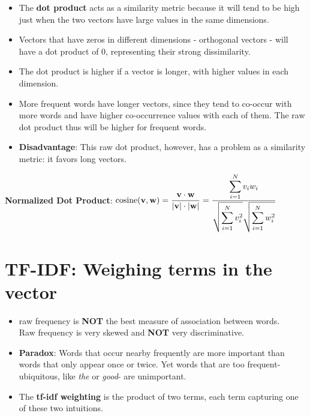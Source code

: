 \begin{itemize}
    \item The \textbf{dot product} acts as a similarity metric because it will tend to be high just when the two vectors have large values in the same dimensions. 
    
    \item Vectors that have zeros in different dimensions - orthogonal vectors - will have a dot product of 0, representing their strong dissimilarity.

    \item The dot product is higher if a vector is longer, with higher values in each dimension.
    
    \item More frequent words have longer vectors, since they tend to co-occur with more words and have higher co-occurrence values with each of them. The raw dot product thus will be higher for frequent words.

    \item \textbf{Disadvantage}: This raw dot product, however, has a problem as a similarity metric: it favors long vectors.

    
\end{itemize}


\textbf{Normalized Dot Product}: \( \displaystyle \operatorname{cosine}(\mathbf{v,w}) = \frac{\mathbf{v\cdot w}}{|\mathbf{v}|\cdot|\mathbf{w}|} = \frac{\displaystyle\sum_{i=1}^{N} v_i w_i}{\displaystyle \sqrt{\sum_{i=1}^{N} v_i^2}\sqrt{\sum_{i=1}^{N} w_i^2}} \)


\section{TF-IDF: Weighing terms in the vector \cite{nlp-1}}\label{TF-IDF: concept}

\begin{itemize}
    \item raw frequency is \textbf{NOT} the best measure of association between words.\\
    Raw frequency is very skewed and \textbf{NOT} very discriminative.

    \item \textbf{Paradox}: Words that occur nearby frequently are more important than words that only appear once or twice. Yet words that are too frequent-ubiquitous, like \textit{the} or \textit{good}- are unimportant.

    \item The \textbf{tf-idf weighting} is the product of two terms, each term capturing one of these two intuitions.
\end{itemize}


